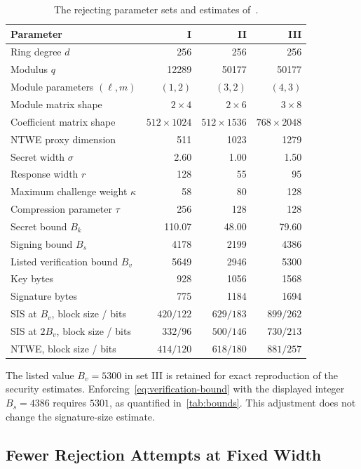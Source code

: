 \begin{table}[!htbp]
\centering
\begin{tabular}{lrrr}
\toprule
Parameter & I & II & III\\
\midrule
Ring degree $d$ & 256 & 256 & 256\\
Modulus $q$ & 12289 & 50177 & 50177\\
Module parameters $(\ell,m)$ & $(1,2)$ & $(3,2)$ & $(4,3)$\\
Module matrix shape & $2\times4$ & $2\times6$ & $3\times8$\\
Coefficient matrix shape & $512\times1024$ & $512\times1536$ & $768\times2048$\\
NTWE proxy dimension & 511 & 1023 & 1279\\
Secret width $\sigma$ & 2.60 & 1.00 & 1.50\\
Response width $r$ & 128 & 55 & 95\\
Maximum challenge weight $\kappa$ & 58 & 80 & 128\\
Compression parameter $\tau$ & 256 & 128 & 128\\
Secret bound $B_k$ & 110.07 & 48.00 & 79.60\\
Signing bound $B_s$ & 4178 & 2199 & 4386\\
Listed verification bound $B_v$ & 5649 & 2946 & 5300\\
Key bytes & 928 & 1056 & 1568\\
Signature bytes & 775 & 1184 & 1694\\
SIS at $B_v$, block size / bits & $420/122$ & $629/183$ & $899/262$\\
SIS at $2B_v$, block size / bits & $332/96$ & $500/146$ & $730/213$\\
NTWE, block size / bits & $414/120$ & $618/180$ & $881/257$\\
\bottomrule
\end{tabular}
\caption{The rejecting parameter sets and estimates of~\cite[Table~1]{GartnerFull}.}
\label{tab:parameters}
\end{table}

The listed value $B_v=5300$ in set III is retained for exact reproduction of the security estimates. Enforcing~\cref{eq:verification-bound} with the displayed integer $B_s=4386$ requires $5301$, as quantified in~\cref{tab:bounds}. This adjustment does not change the signature-size estimate.

\subsection{Fewer Rejection Attempts at Fixed Width}

